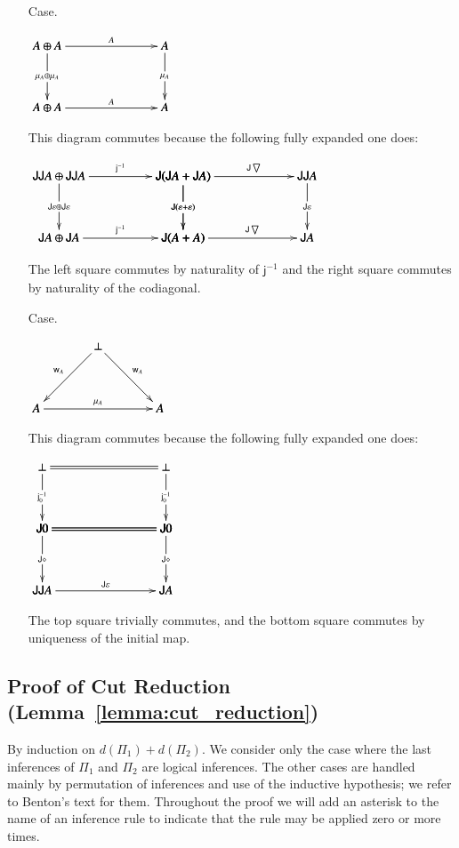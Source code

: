 \documentclass{lmcs}
\let\c\relax
\let\wn\relax
\let\H\relax
\newcommand{\func}[1]{\mathsf{#1}}
\newcommand{\H}[0]{\func{H}}
\newcommand{\J}[0]{\func{J}}
\newcommand{\w}[1]{\mathsf{w}_{#1}}
\newcommand{\c}[1]{\mathsf{c}_{#1}}
\newcommand{\jinv}[1]{\mathsf{j}^{-1}_{#1}}
\newcommand{\wn}[0]{\mathop{?}}
\newcommand{\codiag}[1]{\bigtriangledown_{#1}}
\newenvironment{diagram}{
  \begin{center}
    \begin{math}
      \bfig
}{
      \efig
    \end{math}
  \end{center}
}
\begin{document}
\begin{itemize}
\item[Case.]\ \\
  \begin{diagram}
    \square|amma|<950,500>[
      \wn\wn A \oplus \wn\wn A`
      \wn\wn A`
      \wn A \oplus \wn A`
      \wn A;
      \c{\wn A}`
      \mu_A \oplus \mu_A`
      \mu_A`
      \c{A}]
  \end{diagram}
  This diagram commutes because the following fully expanded one
  does:
  \begin{diagram}
    \square|amma|<1000,500>[
      \J\H\J\H A \oplus \J\H\J\H A`
      \J(\H\J\H A + \H\J\H A)`
      \J\H A \oplus \J\H A`
      \J(\H A + \H A);
      \jinv{}`
      \J\varepsilon \oplus \J\varepsilon`
      \J(\varepsilon + \varepsilon)`
      \jinv{}]

    \square(1000,0)|amma|<1000,500>[
      \J(\H\J\H A + \H\J\H A)`
      \J\H\J\H A`
      \J(\H A + \H A)`
      \J\H A;
      \J\codiag{}`
      \J(\varepsilon + \varepsilon)`
      \J\varepsilon`
      \J\codiag{}]      
  \end{diagram}
  The left square commutes by naturality of $\jinv{}$ and the right
  square commutes by naturality of the codiagonal.
  
\item[Case.]\ \\
  \begin{diagram}
    \Atriangle|aaa|[
      \perp`
      \wn\wn A`
      \wn A;
      \w{\wn A}`
      \w{A}`
      \mu_A]
  \end{diagram}
  This diagram commutes because the following fully expanded one
  does:
  \begin{diagram}
    \square|amma|/=`->`->`=/<1000,500>[
      \perp`
      \perp`
      \J 0`
      \J 0;`
      \jinv{0}`
      \jinv{0}`]

    \square(0,-500)|amma|/=`->`->`->/<1000,500>[
      \J 0`
      \J 0`
      \J\H\J\H A`
      \J\H A;`
      \J\diamond`
      \J\diamond`
      \J\varepsilon]
  \end{diagram}
  The top square trivially commutes, and the bottom square commutes
  by uniqueness of the initial map.
\end{itemize}

\subsection{Proof of Cut Reduction (Lemma~\ref{lemma:cut_reduction})}
\label{subsec:proof_of_cut_reduction_lemma:cut-reduction}
By induction on $d(\Pi_1) + d(\Pi_2)$.  We consider only the case
where the last inferences of $\Pi_1$ and $\Pi_2$ are logical
inferences. The other cases are handled mainly by permutation of
inferences and use of the inductive hypothesis; we refer to Benton's
text for them.  Throughout the proof we will add an asterisk to the
name of an inference rule to indicate that the rule may be applied
zero or more times.
\end{document}
